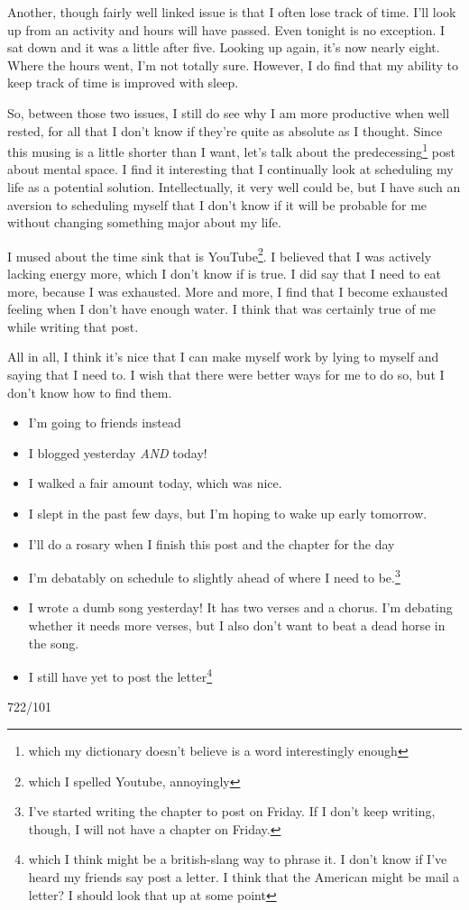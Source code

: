 \documentclass[12pt]{article}[titlepage]
\newcommand{\1}{\={a}}
\newcommand{\2}{\={e}}
\newcommand{\3}{\={\i}}
\newcommand{\4}{\=o}
\newcommand{\5}{\=u}
\newcommand{\6}{\={A}}
\renewcommand{\,}{\textsuperscript{,}}
\begin{document}
Another, though fairly well linked issue is that I often lose track of time.
I'll look up from an activity and hours will have passed.
Even tonight is no exception.
I sat down and it was a little after five.
Looking up again, it's now nearly eight.
Where the hours went, I'm not totally sure.
However, I do find that my ability to keep track of time is improved with sleep.

So, between those two issues, I still do see why I am more productive when well rested, for all that I don't know if they're quite as absolute as I thought.
Since this musing is a little shorter than I want, let's talk about the predecessing\footnote{which my dictionary doesn't believe is a word interestingly enough} post about mental space.
I find it interesting that I continually look at scheduling my life as a potential solution.
Intellectually, it very well could be, but I have such an aversion to scheduling myself that I don't know if it will be probable for me without changing something major about my life.

I mused about the time sink that is YouTube\footnote{which I spelled Youtube, annoyingly}.
I believed that I was actively lacking energy more, which I don't know if is true.
I did say that I need to eat more, because I was exhausted.
More and more, I find that I become exhausted feeling when I don't have enough water.
I think that was certainly true of me while writing that post.

All in all, I think it's nice that I can make myself work by lying to myself and saying that I need to.
I wish that there were better ways for me to do so, but I don't know how to find them.

\begin{itemize}
\item I'm going to friends instead
\item I blogged yesterday \textit{AND} today!
\item I walked a fair amount today, which was nice.
\item I slept in the past few days, but I'm hoping to wake up early tomorrow.
\item I'll do a rosary when I finish this post and the chapter for the day
\item I'm debatably on schedule to slightly ahead of where I need to be.\footnote{I've started writing the chapter to post on Friday. If I don't keep writing, though, I will not have a chapter on Friday.}
\item I wrote a dumb song yesterday! It has two verses and a chorus. I'm debating whether it needs more verses, but I also don't want to beat a dead horse in the song.
\item I still have yet to post the letter\footnote{which I think might be a british-slang way to phrase it. I don't know if I've heard my friends say post a letter. I think that the American might be mail a letter? I should look that up at some point}
\end{itemize}

722/101
\end{document}
